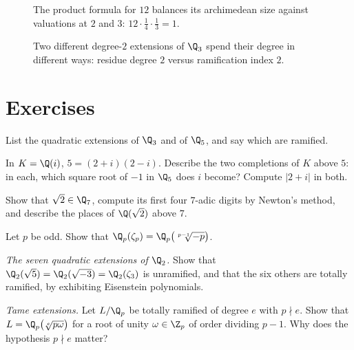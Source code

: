 \begin{figure}[ht]
\centering
{}
\caption{The product formula for $12$ balances its archimedean size against valuations at $2$ and $3$: $12\cdot\frac14\cdot\frac13=1$.}
\label{fig:v13-extra-09-a}
\end{figure}

\begin{figure}[ht]
\centering
{}
\caption{Two different degree-$2$ extensions of $\Q_3$ spend their degree in different ways: residue degree $2$ versus ramification index $2$.}
\label{fig:v13-extra-09-b}
\end{figure}

\section{Exercises}

\begin{exercise}[$\star$]\label{ex:quadQ3}
List the quadratic extensions of $\Q_3$ and of $\Q_5$, and say which are ramified.
\end{exercise}

\begin{exercise}[$\star$]\label{ex:twoplaces}
In $K=\Q(i)$, $5=(2+i)(2-i)$. Describe the two completions of $K$ above $5$: in each, which square root of $-1$ in $\Q_5$
does $i$ become? Compute $|2+i|$ in both.
\end{exercise}

\begin{exercise}[$\star\star$]\label{ex:sqrt2Q7}
Show that $\sqrt2\in\Q_7$, compute its first four $7$-adic digits by Newton's method, and describe the places of $\Q(\sqrt2)$
above $7$.
\end{exercise}

\begin{exercise}[$\star\star$]\label{ex:zetapEis}
Let $p$ be odd. Show that $\Q_p(\zeta_p)=\Q_p\bigl(\sqrt[p-1]{-p}\bigr)$.
\end{exercise}

\begin{exercise}[$\star\star$]\label{ex:seven}
\emph{The seven quadratic extensions of $\Q_2$.} Show that $\Q_2(\sqrt5)=\Q_2(\sqrt{-3})=\Q_2(\zeta_3)$ is unramified, and that
the six others are totally ramified, by exhibiting Eisenstein polynomials.
\end{exercise}

\begin{exercise}[$\star\star\star$]\label{ex:tame}
\emph{Tame extensions.} Let $L/\Q_p$ be totally ramified of degree $e$ with $p\nmid e$. Show that $L=\Q_p\bigl(\sqrt[e]{p\omega}
\bigr)$ for a root of unity $\omega\in\Z_p$ of order dividing $p-1$. Why does the hypothesis $p\nmid e$ matter?
\end{exercise}

